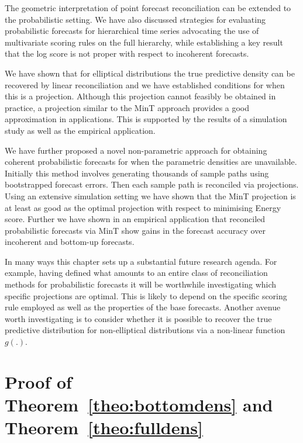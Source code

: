 \documentclass[12pt]{article}
\theoremstyle{definition}
\begin{document}
The geometric interpretation of point forecast reconciliation can be extended to the probabilistic setting. We have also discussed strategies for evaluating probabilistic forecasts for hierarchical time series advocating the use of multivariate scoring rules on the full hierarchy, while establishing a key result that the log score is not proper with respect to incoherent forecasts.

We have shown that for elliptical distributions the true predictive density can be recovered by linear reconciliation and we have established conditions for when this is a projection. Although this projection cannot feasibly be obtained in practice, a projection similar to the MinT approach provides a good approximation in applications. This is supported by the results of a simulation study as well as the empirical application.

We have further proposed a novel non-parametric approach for obtaining coherent probabilistic forecasts for when the parametric densities are unavailable. Initially this method involves generating thousands of sample paths using bootstrapped forecast errors. Then each sample path is reconciled via projections. Using an extensive simulation setting we have shown that the MinT projection is at least as good as the optimal projection with respect to minimising Energy score. Further we have shown in an empirical application that reconciled probabilistic forecasts via MinT show gains in the forecast accuracy over incoherent and bottom-up forecasts.


In many ways this chapter sets up a substantial future research agenda. For example, having defined what amounts to an entire class of reconciliation methods for probabilistic forecasts it will be worthwhile investigating which specific projections are optimal. This is likely to depend on the specific scoring rule employed as well as the properties of the base forecasts. Another avenue worth investigating is to consider whether it is possible to recover the true predictive distribution for non-elliptical distributions via a non-linear function $g(.)$.

\newpage

\appendix

\section{Proof of Theorem~\ref{theo:bottomdens} and Theorem~\ref{theo:fulldens}} \label{app:Bottom&FullDens}
\end{document}
